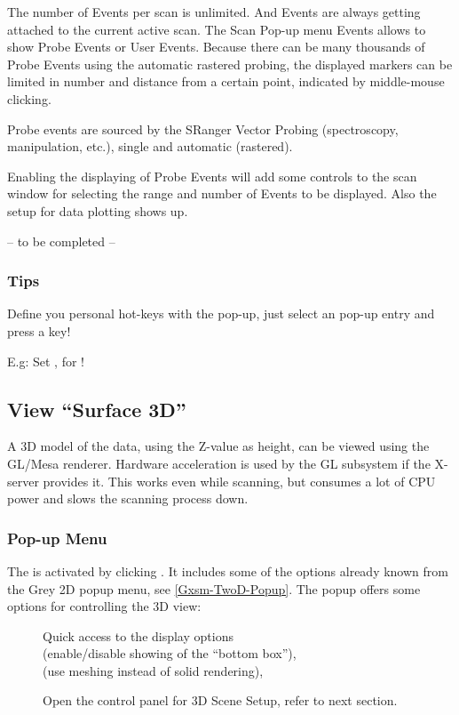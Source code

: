 The number of Events per scan is unlimited. And Events are always
getting attached to the current active scan. The Scan Pop-up menu
Events allows to show Probe Events or User Events. Because there can
be many thousands of Probe Events using the automatic rastered
probing, the displayed markers can be limited in number and distance
from a certain point, indicated by middle-mouse clicking.
 
Probe events are sourced by the SRanger Vector Probing (spectroscopy,
manipulation, etc.), single and automatic (rastered). 
 
Enabling the displaying of Probe Events will add some controls to the
scan window for selecting the range and number of Events to be
displayed. Also the setup for data plotting shows up.

-- to be completed --
 
\subsubsection{Tips}
Define you personal hot-keys with the pop-up, just select an pop-up
entry and press a key!

E.g: Set \GxsmKey{=},\GxsmKey{-} for 
!



\subsection{View ``Surface 3D''}
\label{view:surface}

A 3D model of the data, using the Z-value as height, can be viewed
using the GL/Mesa renderer. Hardware acceleration is used by the GL
subsystem if the X-server provides it. This works even while scanning,
but consumes a lot of CPU power and slows the scanning process down.



\subsubsection{Pop-up Menu}
The  is activated by clicking . It includes some of the options already known from the Grey 2D
popup menu, see \ref{Gxsm-TwoD-Popup}.  The popup offers some options for
controlling the 3D view:
\begin{description}
\item[] Quick access to the display options\\
   (enable/disable showing of the ``bottom box''),\\
   (use meshing instead of solid rendering),\\
\item[] Open the control panel for 3D Scene
  Setup, refer to next section.
\end{description}

